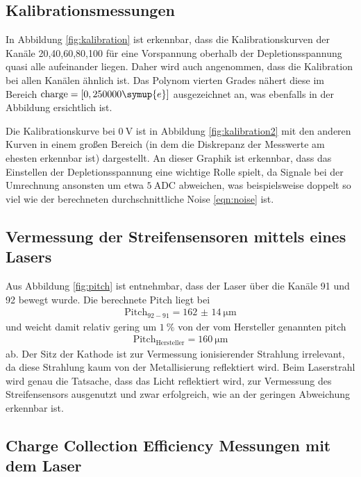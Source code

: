 \subsection{Kalibrationsmessungen}

In Abbildung \ref{fig:kalibration} ist erkennbar, dass die Kalibrationskurven der Kanäle 20,40,60,80,100
für eine Vorspannung oberhalb der Depletionsspannung quasi alle aufeinander liegen. Daher wird auch angenommen, dass
die Kalibration bei allen Kanälen ähnlich ist. Das Polynom vierten Grades
nähert diese im Bereich $\text{charge} = [0,250000 \symup{e}]$ ausgezeichnet an, was ebenfalls in der
Abbildung ersichtlich ist.

Die Kalibrationskurve bei $\SI{0}{\volt}$ ist in Abbildung \ref{fig:kalibration2} mit den anderen Kurven
in einem großen Bereich (in dem die Diskrepanz der Messwerte am ehesten erkennbar ist) dargestellt.
An dieser Graphik ist erkennbar, dass das Einstellen der Depletionsspannung
eine wichtige Rolle spielt, da Signale bei der Umrechnung ansonsten um etwa $\SI{5}{\text{ADC}}$ abweichen, was
beispielsweise doppelt so viel wie der berechneten durchschnittliche Noise \eqref{eqn:noise} ist.

\subsection{Vermessung der Streifensensoren mittels eines Lasers}

Aus Abbildung \ref{fig:pitch} ist entnehmbar, dass der Laser über die Kanäle 91 und 92 bewegt wurde.
Die berechnete Pitch liegt bei
\begin{align}
  \text{Pitch}_{92-91} = \SI{162(14)}{\micro\meter}
\end{align}
und weicht damit relativ gering um $\SI{1}{\percent}$ von der vom Hersteller genannten pitch
\begin{align}
  \text{Pitch}_\text{Hersteller} = \SI{160}{\micro\meter}
\end{align}
ab. Der Sitz der Kathode ist zur Vermessung ionisierender Strahlung irrelevant, da diese Strahlung
kaum von der Metallisierung reflektiert wird. Beim Laserstrahl wird genau die Tatsache, dass das
Licht reflektiert wird, zur Vermessung des Streifensensors ausgenutzt und zwar erfolgreich,
wie an der geringen Abweichung erkennbar ist.

\subsection{Charge Collection Efficiency Messungen mit dem Laser}

